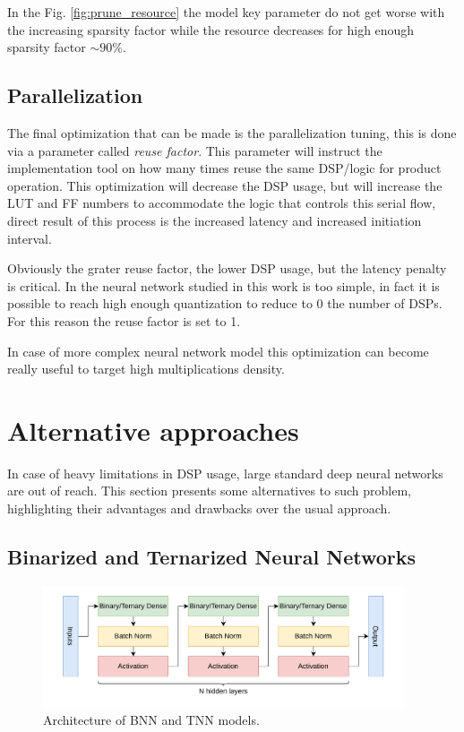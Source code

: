 \documentclass[../../main.tex]{subfiles}
\begin{document}
In the Fig. \ref{fig:prune_resource} the model key parameter do not get worse with the increasing sparsity factor while the resource decreases for high enough sparsity factor $\sim90\%$.



\subsection{Parallelization}
\label{sec:P2GT_Par}
The final optimization that can be made is the parallelization tuning, this is done via a parameter called \textit{reuse factor}. This parameter will instruct the implementation tool on how many times reuse the same DSP/logic for product operation. This optimization will decrease the DSP usage, but will increase the LUT and FF numbers to accommodate the logic that controls this serial flow, direct result of this process is the increased latency and increased initiation interval\cite{hls4ml-DNN}.  

Obviously the grater reuse factor, the lower DSP usage, but the latency penalty is critical. In the neural network studied in this work is too simple, in fact it is possible to reach high enough quantization to reduce to 0 the number of DSPs. For this reason the reuse factor is set to 1.

In case of more complex neural network model this optimization can become really useful to target high multiplications density.  

\section{Alternative approaches}
\label{sec:P2GT_Alt}
In case of heavy limitations in DSP usage, large standard deep neural networks are out of reach. This section presents some alternatives to such problem, highlighting their advantages and drawbacks over the usual approach. 
    
\subsection{Binarized and Ternarized  Neural Networks}
\label{sec:P2GT_BNN}

\begin{figure}[h]
    \centering
    \includegraphics[width=0.95\textwidth]{sections/05/Images/BNNs.pdf}
    \caption{Architecture of BNN and TNN models.}
    \label{fig:BTNN-arch}
\end{figure}
\end{document}
